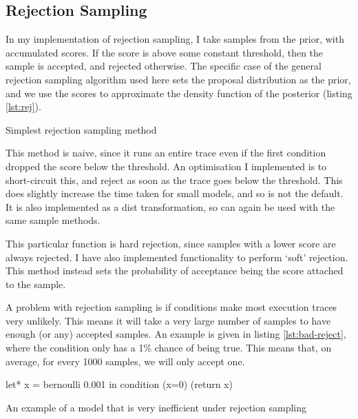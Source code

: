 \subsection{Rejection Sampling} \label{sec:rej}
In my implementation of rejection sampling, I take samples from the prior, with accumulated scores. If the score is above some constant threshold, then the sample is accepted, and rejected otherwise. The specific case of the general rejection sampling algorithm used here sets the proposal distribution as the prior, and we use the scores to approximate the density function of the posterior (listing \ref{lst:rej}).
	
\begin{listing}[!htb]
	\centering
	\caption{Simplest rejection sampling method}
	\label{lst:rej}
\end{listing}
	
This method is naive, since it runs an entire trace even if the first condition dropped the score below the threshold. An optimisation I implemented is to short-circuit this, and reject as soon as the trace goes below the threshold. This does slightly increase the time taken for small models, and so is not the default. It is also implemented as a dist transformation, so can again be used with the same sample methods.
	
This particular function is hard rejection, since samples with a lower score are always rejected. I have also implemented functionality to perform `soft' rejection. This method instead sets the probability of acceptance being the score attached to the sample.
	
A problem with rejection sampling is if conditions make most execution traces very unlikely. This means it will take a very large number of samples to have enough (or any) accepted samples. An example is given in listing \ref{lst:bad-reject}, where the condition only has a 1\% chance of being true. This means that, on average, for every 1000 samples, we will only accept one.
	
\begin{listing}[!htb]
	\centering
	\begin{ocamlcode-in}
let* x = bernoulli 0.001 in
condition (x=0)
(return x)
	\end{ocamlcode-in}
		
	\caption{An example of a model that is very inefficient under rejection sampling}
	\label{lst:bad-reject}
\end{listing}
% 
